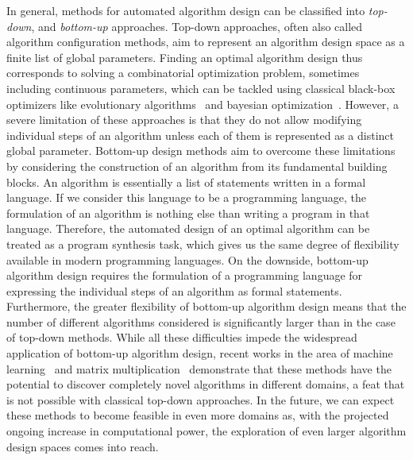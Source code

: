 In general, methods for automated algorithm design can be classified into \emph{top-down}, and \emph{bottom-up} approaches.
Top-down approaches, often also called algorithm configuration methods, aim to represent an algorithm design space as a finite list of global parameters.
Finding an optimal algorithm design thus corresponds to solving a combinatorial optimization problem, sometimes including continuous parameters, which can be tackled using classical black-box optimizers like evolutionary algorithms~\cite{back1996evolutionary} and bayesian optimization~\cite{frazier2018tutorial}.
However, a severe limitation of these approaches is that they do not allow modifying individual steps of an algorithm unless each of them is represented as a distinct global parameter.
Bottom-up design methods aim to overcome these limitations by considering the construction of an algorithm from its fundamental building blocks.
An algorithm is essentially a list of statements written in a formal language.
If we consider this language to be a programming language, the formulation of an algorithm is nothing else than writing a program in that language.
Therefore, the automated design of an optimal algorithm can be treated as a program synthesis task, which gives us the same degree of flexibility available in modern programming languages.
On the downside, bottom-up algorithm design requires the formulation of a programming language for expressing the individual steps of an algorithm as formal statements.
Furthermore, the greater flexibility of bottom-up algorithm design means that the number of different algorithms considered is significantly larger than in the case of top-down methods.
While all these difficulties impede the widespread application of bottom-up algorithm design, recent works in the area of machine learning~\cite{real2020automl,co2021evolving,zz_ne1,zz_ne2} and matrix multiplication~\cite{fawzi2022discovering} demonstrate that these methods have the potential to discover completely novel algorithms in different domains, a feat that is not possible with classical top-down approaches.
In the future, we can expect these methods to become feasible in even more domains as, with the projected ongoing increase in computational power, the exploration of even larger algorithm design spaces comes into reach.

